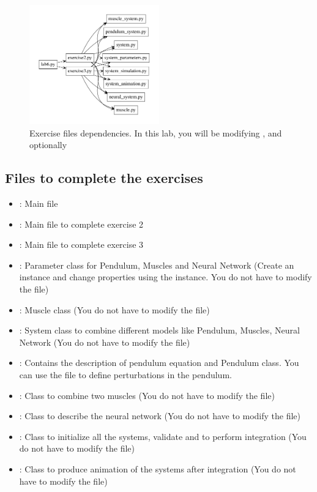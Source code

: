 \documentclass{cmc}
\begin{document}
\begin{figure}[ht]
  \centering \includegraphics[width=0.5\textwidth]{figures/files}
  \caption{\label{fig:files} Exercise files dependencies. In this lab,
    you will be modifying , 
    and optionally }
\end{figure}

\subsection*{Files to complete the exercises}
\label{sec:intro}

\begin{itemize}
\item {} : Main file
\item {} : Main file to complete exercise 2
\item {} : Main file to complete exercise 3
\item {} : Parameter class for Pendulum,
  Muscles and Neural Network (Create an instance and change properties
  using the instance. You do not have to modify the file)
\item {} : Muscle class (You do not have to modify
  the file)
\item {} : System class to combine different models %
  like Pendulum, Muscles, Neural Network (You do not have to modify
  the file)
\item {} : Contains the description of
  pendulum equation and Pendulum class. You can use the file to define
  perturbations in the pendulum.
\item {} : Class to combine two muscles (You
  do not have to modify the file)
\item {} : Class to describe the neural
  network (You do not have to modify the file)
\item {} : Class to initialize all the
  systems, validate and to perform integration (You do not have to
  modify the file)
\item {} : Class to produce animation of
  the systems after integration (You do not have to modify the file)
\end{itemize}
\end{document}
